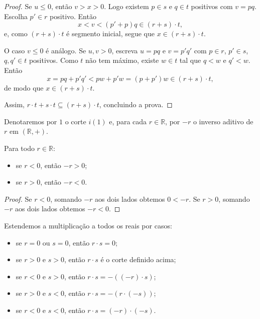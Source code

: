 \begin{proof}
    Se $u\leq 0$, então $v>x>0$.
    Logo existem $p\in s$ e $q\in t$ positivos com $v=pq$.
    Escolha $p'\in r$ positivo.
    Então
    \[
        x<v<(p'+p)q\in (r+s)\cdot t,
    \]
    e, como $(r+s)\cdot t$ é segmento inicial, segue que $x\in (r+s)\cdot t$.

    O caso $v\leq 0$ é análogo.
    Se $u,v>0$, escreva $u=pq$ e $v=p'q'$ com $p\in r$, $p'\in s$, $q,q'\in t$ positivos.
    Como $t$ não tem máximo, existe $w\in t$ tal que $q<w$ e $q'<w$.
    Então
    \[
        x=pq+p'q' < pw+p'w = (p+p')w\in (r+s)\cdot t,
    \]
    de modo que $x\in (r+s)\cdot t$.

    Assim, $r\cdot t+s\cdot t\subseteq (r+s)\cdot t$, concluindo a prova.
\end{proof}

\begin{definition}
    Denotaremos por $1$ o corte $i(1)$ e, para cada $r\in \mathbb R$, por $-r$ o inverso aditivo de $r$ em $(\mathbb R,+)$.
\end{definition}

\begin{lemma}
    Para todo $r\in\mathbb R$:
    \begin{itemize}
        \item se $r<0$, então $-r>0$;
        \item se $r>0$, então $-r<0$.
    \end{itemize}
\end{lemma}
\begin{proof}
    Se $r<0$, somando $-r$ aos dois lados obtemos $0<-r$.
    Se $r>0$, somando $-r$ aos dois lados obtemos $-r<0$.
\end{proof}

\begin{definition}
    Estendemos a multiplicação a todos os reais por casos:
    \begin{itemize}
        \item se $r=0$ ou $s=0$, então $r\cdot s=0$;
        \item se $r>0$ e $s>0$, então $r\cdot s$ é o corte definido acima;
        \item se $r<0$ e $s>0$, então $r\cdot s=-((-r)\cdot s)$;
        \item se $r>0$ e $s<0$, então $r\cdot s=-(r\cdot (-s))$;
        \item se $r<0$ e $s<0$, então $r\cdot s=(-r)\cdot (-s)$.
    \end{itemize}
\end{definition}

